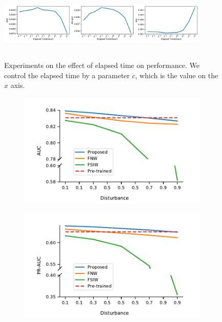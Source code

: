 \documentclass[letterpaper]{article} %
\begin{document}
\begin{figure}[t]
\centering
\includegraphics[width=0.9\textwidth,height=1.4in ]{figures/trade_off.pdf}
\caption{Experiments on the effect of elapsed time on performance. We control the elapsed time by a parameter $c$, which is the value on the $x$ axis.}
\label{fig:trade-off}
\end{figure}

\begin{figure}
\centering
\begin{subfigure}[b]{0.33\textwidth}
\centering
\includegraphics[width=\textwidth]{figures/auc_cut.pdf}
\end{subfigure}
\hfill
\begin{subfigure}[b]{0.33\textwidth}
\centering
\includegraphics[width=\textwidth]{figures/prauc_cut.pdf}

\end{subfigure}
\end{figure}
\end{document}
